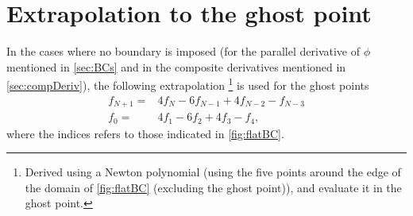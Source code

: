 \section{Extrapolation to the ghost point}
\label{sec:extrapolGhost}
%
In the cases where no boundary is imposed (for the parallel derivative of $\phi$ mentioned in \cref{sec:BCs} and in the composite derivatives mentioned in \cref{sec:compDeriv}), the following extrapolation %
%
\footnote{
Derived using a Newton polynomial (using the five points around the edge of the domain of \cref{fig:flatBC} (excluding the ghost point)), and evaluate it in the ghost point.
}%
is used for the ghost points
%
\begin{align}
    f_{N+1} =& 4f_{N} - 6f_{N-1} + 4f_{N-2} - f_{N-3}
    \label{eq:extraPolUp}
    \\
    f_{0} =& 4f_{1} - 6f_{2} + 4f_{3} - f_{4},
    \label{eq:extraPolDown}
\end{align}
%
where the indices refers to those indicated in \cref{fig:flatBC}.
